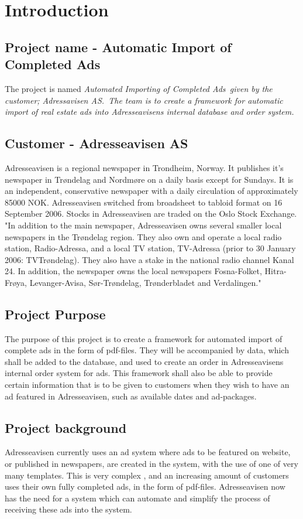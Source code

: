 \section{Introduction}
\subsection{Project name - Automatic Import of Completed Ads}
The project is named \em Automated Importing of Completed Ads\em \ given by the \\
customer; \em Adressavisen AS.\em \ The team is to create a framework for automatic import of real estate ads
into Adresseavisens internal database and order system.
\subsection{Customer - Adresseavisen AS}
Adresseavisen is a regional newspaper in Trondheim, Norway. It publishes it's newspaper in Trøndelag and Nordmøre on a daily basis except for Sundays. It is an independent, conservative newspaper with a daily circulation of approximately 85000 NOK. 
Adresseavisen switched from broadsheet to tabloid format on 16 September 2006. Stocks in Adresseavisen are traded on the Oslo Stock Exchange.\\
"In addition to the main newspaper, Adresseavisen owns several smaller local newspapers in the Trøndelag region. They also own and operate a local radio station, Radio-Adressa, and a local TV station, TV-Adressa (prior to 30 January 2006: TVTrøndelag). They also have a stake in the national radio channel Kanal 24. In addition, the newspaper owns the local newspapers Fosna-Folket, Hitra-Frøya, Levanger-Avisa, Sør-Trøndelag, Trønderbladet and Verdalingen." \cite{adressaWiki}


\subsection{Project Purpose}
The purpose of this project is to create a framework for automated import of complete ads in the form of pdf-files. They will be accompanied by data, which shall be added to the database, and used to create an order in Adresseavisens internal order system for ads. This framework shall also be able to provide certain information that is to be given to customers when they wish to have an ad featured in Adresseavisen, such as available dates and ad-packages.


\subsection{Project background}
Adresseavisen currently uses an ad system where ads to be featured on website, or published in newspapers, are created in the system, with the use of one of very many templates. This is very complex , and an increasing amount of customers uses their own fully completed ads, in the form of pdf-files. 
Adresseavisen now has the need for a system which can automate and simplify the process of receiving these ads into the system.

